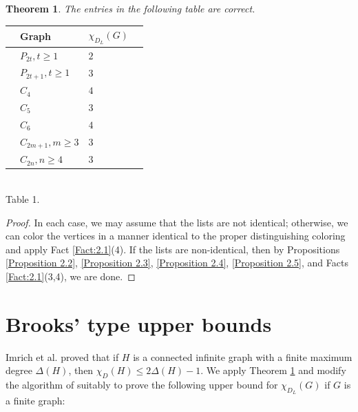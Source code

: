 \documentclass[12pt,reqno,a4paper]{amsart}
\theoremstyle{definition}
\newtheorem{thm}[defn]{Theorem}
\begin{document}
\begin{thm}\label{Theorem 2.7}
    {\em The entries in the following table are correct.}
    
\begin{center}
      \begin{tabular}{|ll|l|l|}
        \hline
             & Graph & $\chi_{D_L}(G)$ \\
             \hline\hline
             & $P_{2t}, t\geq 1$ & $2$\\
             & $P_{2t+1}, t\geq 1$ & $3$ \\
             & $C_4$ & $4$ \\
             & $C_5$ & $3$ \\
             & $C_6$ & $4$\\
             & $C_{2m+1}, m\geq 3$  & $3$ \\
             & $C_{2n}, n\geq 4$ & $3$ \\
               
        \hline
        \end{tabular}
        \\
       Table 1. 

        \label{tab:my_label-first}

    \end{center}  
\end{thm}

\begin{proof}
In each case, we may assume that the lists are not identical; otherwise, we can color the vertices in a manner identical to the proper distinguishing coloring and apply Fact \ref{Fact:2.1}(4). If the lists are non-identical, then by Propositions \ref{Proposition 2.2}, \ref{Proposition 2.3}, \ref{Proposition 2.4}, \ref{Proposition 2.5}, and Facts \ref{Fact:2.1}(3,4), we are done.
\end{proof}

\section{Brooks' type upper bounds}

Imrich et al. \cite[Theorem 3]{IKPS2017} proved that if $H$ is a connected infinite graph with a finite maximum degree $\Delta(H)$, then $\chi_{D}(H)\leq 2\Delta(H)-1$.
We apply Theorem \ref{Theorem 2.7} and modify the algorithm of \cite[Theorem 3]{IKPS2017} suitably to prove the following upper bound for $\chi_{D_{L}}(G)$ if $G$ is a finite graph:
\end{document}
